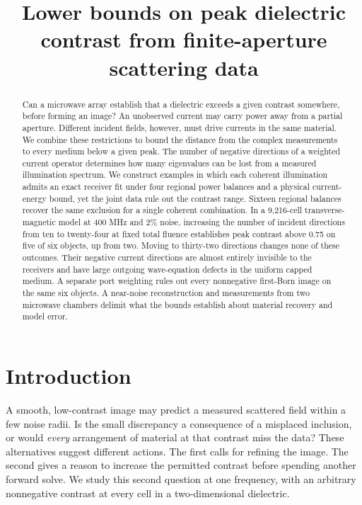 \documentclass[anonymous,12pt]{iopjournal}
\numberwithin{equation}{section}
\begin{document}
\par\vspace{1.8ex}
\title{Lower bounds on peak dielectric contrast from finite-aperture scattering data}
\author{}
\begin{abstract}
Can a microwave array establish that a dielectric exceeds a given contrast somewhere, before forming an image? An unobserved current may carry power away from a partial aperture. Different incident fields, however, must drive currents in the same material. We combine these restrictions to bound the distance from the complex measurements to every medium below a given peak. The number of negative directions of a weighted current operator determines how many eigenvalues can be lost from a measured illumination spectrum. We construct examples in which each coherent illumination admits an exact receiver fit under four regional power balances and a physical current-energy bound, yet the joint data rule out the contrast range. Sixteen regional balances recover the same exclusion for a single coherent combination. In a 9,216-cell transverse-magnetic model at 400 MHz and 2\% noise, increasing the number of incident directions from ten to twenty-four at fixed total fluence establishes peak contrast above 0.75 on five of six objects, up from two. Moving to thirty-two directions changes none of these outcomes. Their negative current directions are almost entirely invisible to the receivers and have large outgoing wave-equation defects in the uniform capped medium. A separate port weighting rules out every nonnegative first-Born image on the same six objects. A near-noise reconstruction and measurements from two microwave chambers delimit what the bounds establish about material recovery and model error.
\end{abstract}

\section{Introduction}
A smooth, low-contrast image may predict a measured scattered field within a few noise radii. Is the small discrepancy a consequence of a misplaced inclusion, or would \emph{every} arrangement of material at that contrast miss the data? These alternatives suggest different actions. The first calls for refining the image. The second gives a reason to increase the permitted contrast before spending another forward solve. We study this second question at one frequency, with an arbitrary nonnegative contrast at every cell in a two-dimensional dielectric.
\end{document}
